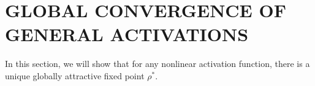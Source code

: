 \documentclass[twoside]{article}
\newcommand{\km}{\kappa_\phi}
\newcommand{\E}{\mathbb{E}\,}
\theoremstyle{definition}
\newcommand{\thomas}[1]{{\color{blue}\textit{#1}}}
\begin{document}






\section{GLOBAL CONVERGENCE OF GENERAL ACTIVATIONS}
In this section, we will show that for any nonlinear activation function, there is a unique globally attractive fixed point $\rho^*.$ 
\end{document}
